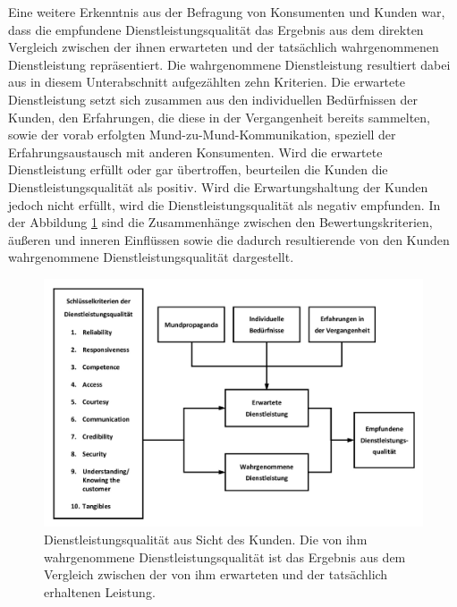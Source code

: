 Eine weitere Erkenntnis aus der Befragung von Konsumenten und Kunden war, dass die empfundene Dienstleistungsqualität das Ergebnis aus dem direkten Vergleich zwischen der ihnen erwarteten und der tatsächlich wahrgenommenen Dienstleistung repräsentiert. Die wahrgenommene Dienstleistung resultiert dabei aus in diesem Unterabschnitt aufgezählten zehn Kriterien. Die erwartete Dienstleistung setzt sich zusammen aus den individuellen Bedürfnissen der Kunden, den Erfahrungen, die diese in der Vergangenheit bereits sammelten, sowie der vorab erfolgten Mund-zu-Mund-Kommunikation, speziell der Erfahrungsaustausch mit anderen Konsumenten. Wird die erwartete Dienstleistung erfüllt oder gar übertroffen, beurteilen die Kunden die Dienstleistungsqualität als positiv. Wird die Erwartungshaltung der Kunden jedoch nicht erfüllt, wird die Dienstleistungsqualität als negativ empfunden. In der Abbildung \ref{determinants} sind die Zusammenhänge zwischen den Bewertungskriterien, äußeren und inneren Einflüssen sowie die dadurch resultierende von den Kunden wahrgenommene Dienstleistungsqualität dargestellt.
\begin{figure} [H]
\centering
\includegraphics[width=12cm]{B2B/Bilder/determinants2}
\caption[Konsumentensicht der Dienstleistungsqualität]{Dienstleistungsqualität aus Sicht des Kunden. Die von ihm wahrgenommene Dienstleistungsqualität ist das Ergebnis aus dem Vergleich zwischen der von ihm erwarteten und der tatsächlich erhaltenen Leistung.\protect\footnotemark}
\label{determinants}
\end{figure}


